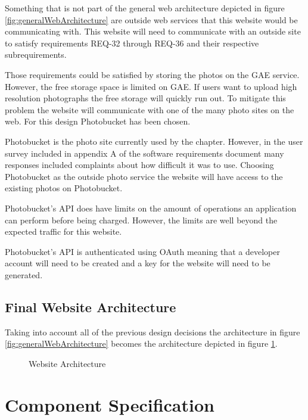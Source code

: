 \documentclass{article}
\begin{document}
Something that is not part of the general web architecture depicted in figure \ref{fig:generalWebArchitecture} are outside
web services that this website would be communicating with. This website will need to communicate with an outside site to satisfy requirements REQ-32 through REQ-36 and their respective subrequirements. \cite{schwab_apo_srs_2012}

Those requirements could be satisfied by storing the photos on the GAE service. However, the free storage space is limited
on GAE. If users want to upload high resolution photographs the free storage will quickly run out. To mitigate this problem
the website will communicate with one of the many photo sites on the web. For this design Photobucket has been chosen. \cite{_photobucket_2012}

Photobucket is the photo site currently used by the chapter. However, in the user survey included in appendix A of 
the software requirements document many responses included complaints about how difficult it was to use.\cite{schwab_apo_srs_2012}  Choosing Photobucket as the outside photo service the website will have access to the existing photos on Photobucket.

Photobucket's API does have limits on the amount of operations an application can perform before being charged. \cite{photobucket_method_2010} However, the limits are well beyond the expected traffic for this website.

Photobucket's API is authenticated using OAuth meaning that a developer account will need to be created and a key for the
website will need to be generated. \cite{photobucket_faq_2010}

\subsection{Final Website Architecture}

Taking into account all of the previous design decisions the architecture in figure \ref{fig:generalWebArchitecture}
becomes the architecture depicted in figure \ref{fig:finalWebArchitecture}.

\FloatBarrier
\begin{figure}[h!]

\caption{Website Architecture}
\label{fig:finalWebArchitecture}
\end{figure}
\FloatBarrier

\section{Component Specification}
\end{document}
